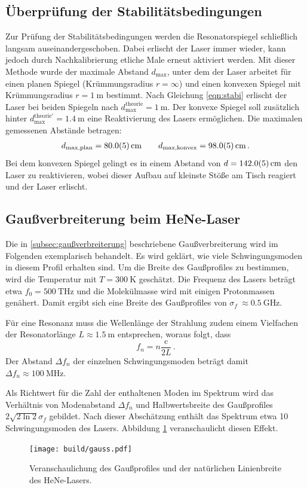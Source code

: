 \subsection{Überprüfung der Stabilitätsbedingungen}
\label{subsec:stabilitätsbedingungen}
Zur Prüfung der Stabilitätsbedingungen werden die Resonatorspiegel schließlich
langsam auseinandergeschoben.
Dabei erlischt der Laser immer wieder, kann jedoch durch Nachkalibrierung
etliche Male erneut aktiviert werden.
Mit dieser Methode wurde der maximale Abstand $d_\text{max}$,
unter dem der Laser arbeitet
für einen planen Spiegel (Krümmungsradius $r = \infty$) und einen konvexen
Spiegel mit Krümmungsradius $r = \SI{1}{\meter}$ bestimmt.
Nach Gleichung \eqref{eqn:stabi} erlischt der Laser bei beiden Spiegeln nach
$d_\text{max}^\text{theorie} = \SI{1}{\meter}$. Der konvexe Spiegel soll
zusätzlich hinter $d_\text{max}^{\text{theorie}\prime} = \SI{1.4}{\meter}$ eine
Reaktivierung des Lasers ermöglichen.
Die maximalen gemessenen Abstände betragen:
\begin{align*}
    d_\text{max,plan} = \SI{80\pm0.5}{\centi\meter} \qquad
    d_\text{max,konvex} = \SI{98\pm0.5}{\centi\meter}\,.
\end{align*}
Bei dem konvexen Spiegel gelingt es in einem Abstand von
$d=\SI{142\pm0.5}{\centi\meter}$ den Laser zu reaktivieren, wobei dieser Aufbau
auf kleinste Stöße am Tisch reagiert und der Laser erlischt.

\subsection{Gaußverbreiterung beim HeNe-Laser}
\label{subsec:gauß_diskussion}
Die in \ref{subsec:gaußverbreiterung} beschriebene Gaußverbreiterung wird im
Folgenden exemplarisch behandelt.
Es wird geklärt, wie viele Schwingungsmoden in diesem Profil erhalten sind.
Um die Breite des Gaußprofiles zu bestimmen, wird die Temperatur mit 
$T = \SI{300}{\kelvin}$ geschätzt. Die Frequenz des Lasers beträgt etwa
$f_0 = \SI{500}{\tera\hertz}$ und die Molekülmasse wird mit einigen
Protonmassen genähert.
Damit ergibt sich eine Breite des Gaußprofiles von $\sigma_f \
\approx \SI{0.5}{\giga\hertz}$.

Für eine Resonanz muss die Wellenlänge der Strahlung zudem einem Vielfachen
der Resonatorlänge $L\approx \SI{1.5}{\meter}$ entsprechen, woraus folgt, dass
\begin{equation*}
    f_n = n \frac{\mathrm{c}}{2L}\,.
\end{equation*}
Der Abstand $\Delta f_n$ der einzelnen Schwingungsmoden beträgt damit 
$\Delta f_n \approx \SI{100}{\mega\hertz}$.

Als Richtwert für die Zahl der enthaltenen Moden im Spektrum wird das
Verhältnis von Modenabstand $\Delta f_n$ und Halbwertsbreite des Gaußprofiles
$2\sqrt{2\ln2} \sigma_f$ gebildet.
Nach dieser Abschätzung enthält das Spektrum etwa \num{10} Schwingungsmoden
des Lasers.
Abbildung \ref{fig:gauß} veranschaulicht diesen Effekt.
\begin{figure}
    \centering
    \texttt{[image: build/gauss.pdf]}
    \caption{
        Veranschaulichung des Gaußprofiles und der natürlichen Linienbreite
        des HeNe-Lasers.
    }
    \label{fig:gauß}
\end{figure}
